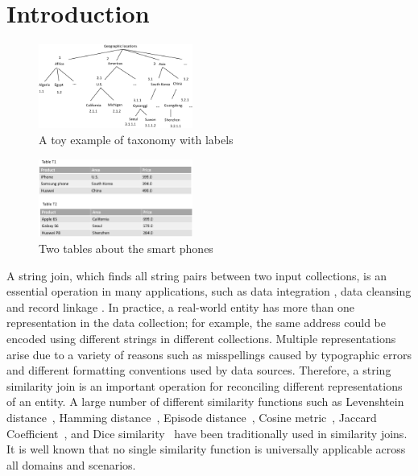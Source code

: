 \section{Introduction}

\begin{figure}[t]
\centering
\includegraphics[width=0.45\textwidth]{figures/taxonomylabels}
 \caption{A toy example of taxonomy with labels}
\label{fig:taxonomyexample}
\end{figure}


\begin{figure}[t]
\centering
\includegraphics[width=0.45\textwidth]{figures/productexample}
 \caption{Two tables about the smart phones}
\label{fig:twotables}
\end{figure}


A string join, which finds all string pairs between two input collections, is an essential operation in many applications, such as  data integration \cite{conf/sigmod/Sarawagi04}, data cleansing \cite{conf/vldb/ArasuGK06,journals/www/LiJM06} and record linkage \cite{books/Winkler99}. In practice, a real-world entity has more than one representation in the data
collection; for example, the same address could be encoded using
different strings in different collections. Multiple representations
arise due to a variety of reasons such as misspellings
caused by typographic errors and different formatting conventions
used by data sources. Therefore, a string similarity join is an important operation for reconciling different
representations of an entity. A large number of different similarity functions such as Levenshtein distance~\cite{conf/sigmod/WangLF12},
Hamming distance~\cite{conf/spire/Kondrak05}, Episode
distance~\cite{conf/ijcai/CohenRF03}, Cosine
metric~\cite{journals/ipm/SaltonB88}, Jaccard
Coefficient~\cite{conf/icde/ChaudhuriGK06,conf/icde/LiLL08}, and Dice
similarity~\cite{conf/www/BayardoMS07} have been traditionally used in similarity joins. It is well known
that no single similarity function is universally applicable
across all domains and scenarios.


